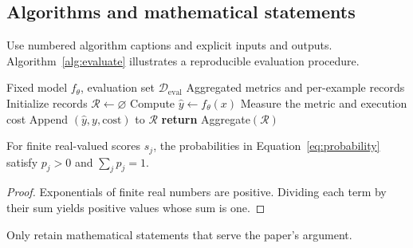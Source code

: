 \subsection{Algorithms and mathematical statements}
Use numbered algorithm captions and explicit inputs and outputs.
Algorithm~\ref{alg:evaluate} illustrates a reproducible evaluation procedure.
\begin{algorithm}[ht]
\caption{Evaluation procedure}\label{alg:evaluate}
\begin{algorithmic}[1]
\REQUIRE Fixed model $f_\theta$, evaluation set $\mathcal{D}_{\mathrm{eval}}$
\ENSURE Aggregated metrics and per-example records
\STATE Initialize records $\mathcal{R}\gets\varnothing$
  \STATE Compute $\hat y\gets f_\theta(x)$
  \STATE Measure the metric and execution cost
  \STATE Append $(\hat y,y,\mathrm{cost})$ to $\mathcal{R}$
\ENDFOR
\STATE \textbf{return} Aggregate$(\mathcal{R})$
\end{algorithmic}
\end{algorithm}

\begin{proposition}\label{prop:normalization}
For finite real-valued scores $s_j$, the probabilities in
Equation~\eqref{eq:probability} satisfy $p_j>0$ and $\sum_jp_j=1$.
\end{proposition}
\begin{proof}
Exponentials of finite real numbers are positive. Dividing each term by their
sum yields positive values whose sum is one.
\end{proof}
Only retain mathematical statements that serve the paper's argument.
